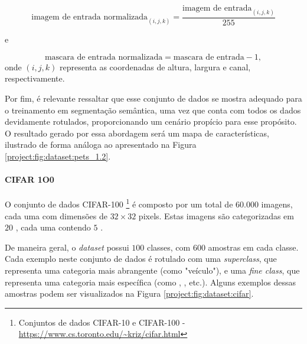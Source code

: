 \begin{equation}
    \label{project:eq:dataset:pets_1}
    \text{imagem de entrada normalizada}_{(i,j,k)} = \frac{\text{imagem de entrada}_{(i,j,k)}}{255}
\end{equation}

e

\begin{equation}
    \label{project:eq:dataset:pets_2}
    \text{mascara de entrada normalizada} = \text{mascara de entrada} - 1,
\end{equation}
onde $(i,j,k)$ representa as coordenadas de altura, largura e canal, respectivamente.

Por fim, é relevante ressaltar que esse conjunto de dados se mostra adequado para o treinamento em segmentação semântica, uma vez que conta com todos os dados devidamente rotulados, proporcionando um cenário propício para esse propósito. O resultado gerado por essa abordagem será um mapa de características, ilustrado de forma análoga ao apresentado na Figura \ref{project:fig:dataset:pets_1.2}.

\paragraph{CIFAR 1O0}
\label{project:dataset:cifar}
O conjunto de dados CIFAR-100 \footnote{Conjuntos de dados CIFAR-10 e CIFAR-100 - \url{https://www.cs.toronto.edu/~kriz/cifar.html}} \citep{Krizhevsky2014TheDataset} é composto por um total de $60.000$ imagens, cada uma com dimensões de $32 \times 32$ pixels. Estas imagens são categorizadas em $20$ , cada uma contendo $5$ .

De maneira geral, o \textit{dataset} possui $100$ classes, com $600$ amostras em cada classe. Cada exemplo neste conjunto de dados é rotulado com uma \textit{superclass}, que representa uma categoria mais abrangente (como "veículo"), e uma \textit{fine class}, que representa uma categoria mais específica (como , , etc.). Alguns exemplos dessas amostras podem ser visualizados na Figura \ref{project:fig:dataset:cifar}.

